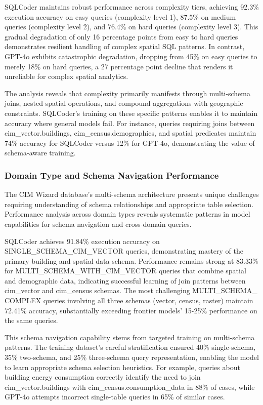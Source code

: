 SQLCoder maintains robust performance across complexity tiers, achieving 92.3\% execution accuracy on easy queries (complexity level 1), 87.5\% on medium queries (complexity level 2), and 76.4\% on hard queries (complexity level 3). This gradual degradation of only 16 percentage points from easy to hard queries demonstrates resilient handling of complex spatial SQL patterns. In contrast, GPT-4o exhibits catastrophic degradation, dropping from 45\% on easy queries to merely 18\% on hard queries, a 27 percentage point decline that renders it unreliable for complex spatial analytics.

The analysis reveals that complexity primarily manifests through multi-schema joins, nested spatial operations, and compound aggregations with geographic constraints. SQLCoder's training on these specific patterns enables it to maintain accuracy where general models fail. For instance, queries requiring joins between cim\_vector.buildings, cim\_census.demographics, and spatial predicates maintain 74\% accuracy for SQLCoder versus 12\% for GPT-4o, demonstrating the value of schema-aware training.

\subsubsection{Domain Type and Schema Navigation Performance}

The CIM Wizard database's multi-schema architecture presents unique challenges requiring understanding of schema relationships and appropriate table selection. Performance analysis across domain types reveals systematic patterns in model capabilities for schema navigation and cross-domain queries.

SQLCoder achieves 91.84\% execution accuracy on SINGLE\_SCHEMA\_CIM\_VECTOR queries, demonstrating mastery of the primary building and spatial data schema. Performance remains strong at 83.33\% for MULTI\_SCHEMA\_WITH\_CIM\_VECTOR queries that combine spatial and demographic data, indicating successful learning of join patterns between cim\_vector and cim\_census schemas. The most challenging MULTI\_SCHEMA\_ COMPLEX queries involving all three schemas (vector, census, raster) maintain 72.41\% accuracy, substantially exceeding frontier models' 15-25\% performance on the same queries.

This schema navigation capability stems from targeted training on multi-schema patterns. The training dataset's careful stratification ensured 40\% single-schema, 35\% two-schema, and 25\% three-schema query representation, enabling the model to learn appropriate schema selection heuristics. For example, queries about building energy consumption correctly identify the need to join cim\_vector.buildings with cim\_census.consumption\_data in 88\% of cases, while GPT-4o attempts incorrect single-table queries in 65\% of similar cases.

